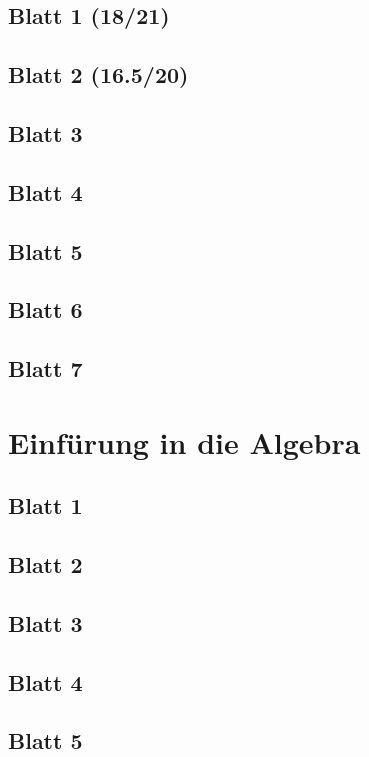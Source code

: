 \documentclass{tuftebook}
\numberwithin{Theorem}{chapter}
\theoremstyle{definition}
\theoremstyle{definition}
\begin{document}
\section{Blatt 1 (18/21)}

\section{Blatt 2 (16.5/20)}

\section{Blatt 3}

\section{Blatt 4}

\section{Blatt 5}

\section{Blatt 6}

\section{Blatt 7}


\chapter{Einf\"{u}rung in die Algebra}
\section{Blatt 1}

\section{Blatt 2}

\section{Blatt 3}

\section{Blatt 4}

\section{Blatt 5}

\end{document}
